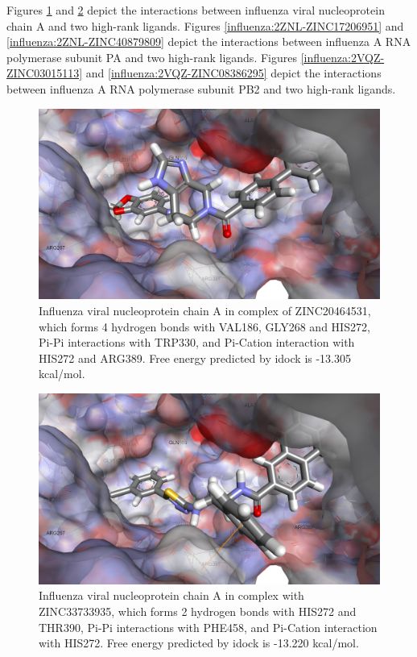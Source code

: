 Figures \ref{influenza:2IQH-ZINC20464531} and \ref{influenza:2IQH-ZINC33733935} depict the interactions between influenza viral nucleoprotein chain A and two high-rank ligands. Figures \ref{influenza:2ZNL-ZINC17206951} and \ref{influenza:2ZNL-ZINC40879809} depict the interactions between influenza A RNA polymerase subunit PA and two high-rank ligands. Figures \ref{influenza:2VQZ-ZINC03015113} and \ref{influenza:2VQZ-ZINC08386295} depict the interactions between influenza A RNA polymerase subunit PB2 and two high-rank ligands.

\begin{figure}
\centering
\includegraphics[width=\linewidth]{../influenza/2IQH-ZINC20464531.png}
\caption{Influenza viral nucleoprotein chain A in complex of ZINC20464531, which forms 4 hydrogen bonds with VAL186, GLY268 and HIS272, Pi-Pi interactions with TRP330, and Pi-Cation interaction with HIS272 and ARG389. Free energy predicted by idock is -13.305 kcal/mol.}
\label{influenza:2IQH-ZINC20464531}
\end{figure}

\begin{figure}
\centering
\includegraphics[width=\linewidth]{../influenza/2IQH-ZINC33733935.png}
\caption{Influenza viral nucleoprotein chain A in complex with ZINC33733935, which forms 2 hydrogen bonds with HIS272 and THR390, Pi-Pi interactions with PHE458, and Pi-Cation interaction with HIS272. Free energy predicted by idock is -13.220 kcal/mol.}
\label{influenza:2IQH-ZINC33733935}
\end{figure}

